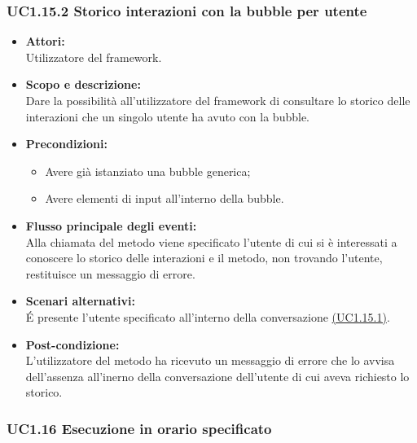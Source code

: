 \subsubsection{UC1.15.2 Storico interazioni con la bubble per utente} \label{UC1.15.2}

\begin{itemize}
	\item \textbf{Attori:}
	\\Utilizzatore del framework.
	\item \textbf{Scopo e descrizione:} 
	\\Dare la possibilità all'utilizzatore del framework di consultare lo storico delle interazioni che un singolo utente ha avuto con la bubble.
	\item \textbf{Precondizioni:}
	\begin{itemize}
		\item Avere già istanziato una bubble generica;
		\item Avere elementi di input all'interno della bubble.
	\end{itemize}
	\item \textbf{Flusso principale degli eventi:}
	\\Alla chiamata del metodo viene specificato l'utente di cui si è interessati a conoscere lo storico delle interazioni e il metodo, non trovando l’utente, restituisce un messaggio di errore.
	\item \textbf{Scenari alternativi:}
	\\É presente l’utente specificato all'interno della conversazione \hyperref[UC1.15.1]{(UC1.15.1)}.
	\item \textbf{Post-condizione:}
	\\L’utilizzatore del metodo ha ricevuto un messaggio di errore che lo avvisa dell’assenza all’inerno della conversazione dell’utente di cui aveva richiesto lo storico.
\end{itemize}

\subsubsection{UC1.16 Esecuzione in orario specificato} \label{UC1.16}

